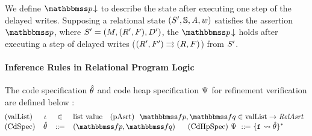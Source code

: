 {\color{blue}
We define $\nxtAst{\relastP}$ to describe the 
state after executing one step of the delayed writes.  
Supposing a relational state 
$(S', \mathbb{S}, \textit{A}, w)$ satisfies the 
assertion $\relastP$, where $S' = (M, (R', F), D')$, 
the $\nxtAst{\relastP}$ holds after executing a step 
of delayed writes (${(R', F')}\rightrightarrows{(R, F)}$) 
from $S'$.
}

\paragraph{Inference Rules in Relational Program Logic}
The code specification $\hat{\theta}$ and code heap specification 
$\Psi$ for refinement verification are defined below : 
\[
    \small
    \!\!\!\!
    \begin{array}{lccl}
        \TYPE{(valList)} & 
        \lgvl & \in & \TYPE{list} \ \TYPE{value}
        \ \ \
        \TYPE{(pAsrt)} \ \
        \relspecpre, \relspecpost \in
        \TYPE{valList} \rightarrow \textit{RelAsrt} \\
        \TYPE{(CdSpec)} & \RelBspec & \define & 
        (\relspecpre, \relspecpost) \quad \ \   
        \TYPE{(CdHpSpec)} \ \Cspec \ \define \ 
        \{ \lab{} \rightsquigarrow \RelBspec \}^{*} 
    \end{array}
\]
			
